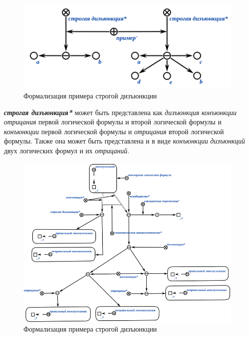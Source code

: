 \begin{figure}[H]
	\includegraphics[scale=0.8]{author/part2/figures/logic/strictDisjunction.png}
	\caption{Формализация примера строгой дизъюнкции}
	\label{fig:strict_disjunction}
\end{figure}

\textbf{\textit{строгая дизъюнкция*}} может быть представлена как \textit{дизъюнкция} \textit{конъюнкции} \textit{отрицания} первой логической формулы и второй логической формулы и \textit{конъюнкции} первой логической формулы и \textit{отрицания} второй логической формулы. Также она может быть представлена и в виде \textit{конъюнкции} \textit{дизъюнкций} двух логических формул и их \textit{отрицаний}.

\begin{figure}[H]
	\includegraphics[scale=0.8]{author/part2/figures/logic/strict_disjunction_representation.png}
	\caption{Формализация примера строгой дизъюнкции}
	\label{fig:strict_disjunction_representation}
\end{figure}

\begin{SCn}
\end{SCn}

